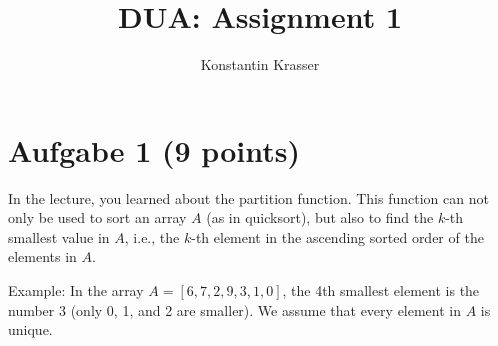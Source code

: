 \documentclass[11pt]{article}
\begin{document}
\author{Konstantin Krasser}
\title{DUA: Assignment 1}
\maketitle

\medskip

\section*{Aufgabe 1 (9 points)}

In the lecture, you learned about the partition function. This function can not only be used to sort an array $A$ (as in quicksort), but also to find the $k$-th smallest value in $A$, i.e., the $k$-th element in the ascending sorted order of the elements in $A$.

Example: In the array $A=[6,7,2,9,3,1,0]$, the 4th smallest element is the number 3 (only 0, 1, and 2 are smaller). We assume that every element in $A$ is unique.
\end{document}
